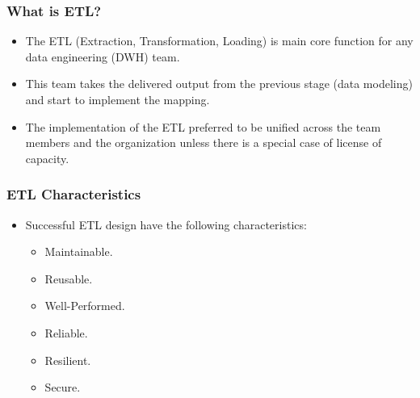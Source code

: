 \begin{frame}
\frametitle{What is ETL?}

\begin{itemize}[<+->]
	\item The ETL (Extraction, Transformation, Loading) is main core function for any data engineering (DWH) team.
	\item This team takes the delivered output from the previous stage (data modeling) and start to implement the mapping.
	\item The implementation of the ETL preferred to be unified across the team members and the organization unless there is a special case of license of capacity.
	
\end{itemize}		


\end{frame}

\begin{frame}
\frametitle{ETL Characteristics}
\begin{itemize}[<+->]
	\item Successful ETL design have the following characteristics:
		\begin{itemize}[<+->]
			\item [\faCheckSquareO] Maintainable.
			\item [\faCheckSquareO] Reusable.
			\item [\faCheckSquareO] Well-Performed.
			\item [\faCheckSquareO] Reliable.
			\item [\faCheckSquareO] Resilient.
			\item [\faCheckSquareO] Secure.
		\end{itemize}
\end{itemize}
\end{frame}


